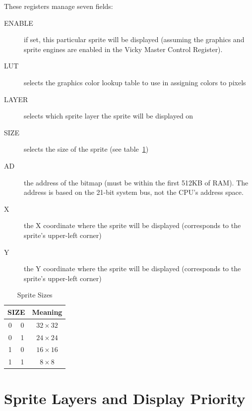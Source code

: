 These registers manage seven fields:

\begin{description}
    \item[ENABLE] if set, this particular sprite will be displayed (assuming the graphics and sprite engines are enabled in the Vicky Master Control Register).

    \item[LUT] selects the graphics color lookup table to use in assigning colors to pixels

    \item[LAYER] selects which sprite layer the sprite will be displayed on

    \item[SIZE] selects the size of the sprite (see table~\ref{tab:sp_sizes})

    \item[AD] the address of the bitmap (must be within the first 512KB of RAM). The address is based on the 21-bit system bus, not the CPU's address space.

    \item[X] the X coordinate where the sprite will be displayed (corresponds to the sprite's upper-left corner)

    \item[Y] the Y coordinate where the sprite will be displayed (corresponds to the sprite's upper-left corner)
\end{description}

\begin{table}[ht]
    \begin{center}
        \begin{tabular}{|c|c|c|} \hline
            \multicolumn{2}{|c|}{SIZE} & Meaning \\ \hline\hline
            0 & 0 & $32 \times 32$ \\ \hline
            0 & 1 & $24 \times 24$ \\ \hline
            1 & 0 & $16 \times 16$ \\ \hline
            1 & 1 & $8 \times 8$ \\ \hline
        \end{tabular}
    \end{center}
    \caption{Sprite Sizes}
    \label{tab:sp_sizes}
\end{table}

\section*{Sprite Layers and Display Priority}

